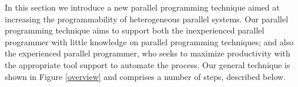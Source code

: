 \documentclass[smallextended]{svjour3}
\begin{document}
\noindent
In this section we introduce a new parallel programming technique aimed at increasing the programmability of heterogeneous 
parallel systems.
Our parallel programming technique aims to support both the inexperienced parallel programmer with 
little knowledge on parallel programming techniques; and also the experienced parallel programmer, who
seeks to maximize productivity with the appropriate tool support to automate the process. 
Our general technique is shown in Figure \ref{overview} and comprises a number of steps, described below.
\end{document}
